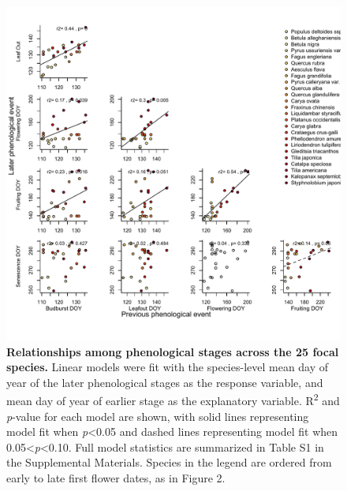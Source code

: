 \documentclass{article}
\begin{document}
  \begin{figure}[h]
  \centering
  \includegraphics{../analyses/figures/latevearly_rp_col_legend_YOR.pdf}
  
  \caption{\textbf{Relationships among phenological stages across the 25 focal species.} Linear models were fit with the species-level mean day of year of the later phenological stages as the response variable, and mean day of year of earlier stage as the explanatory variable. R\textsuperscript{2} and \textit{p}-value for each model are shown, with solid lines representing model fit when \textit{p}<0.05 and dashed lines representing model fit when 0.05<\textit{p}<0.10. Full model statistics are summarized in Table S1 in the Supplemental Materials. Species in the legend are ordered from early to late first flower dates, as in Figure 2.}
  \label{fig:latevearly}
\end{figure}
\end{document}
